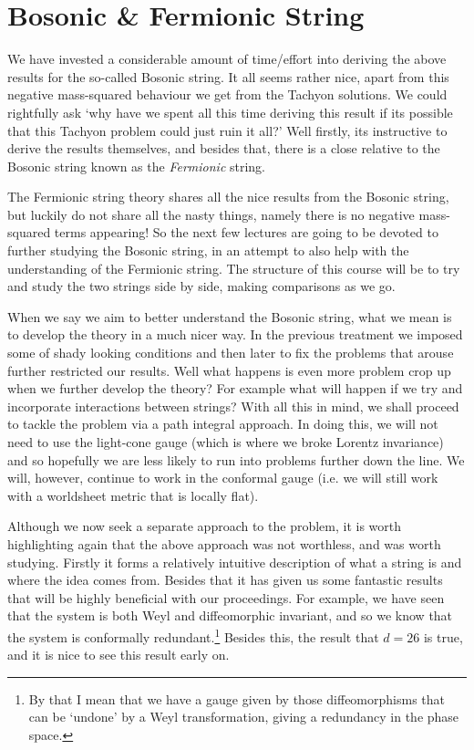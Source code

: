 \section{Bosonic \& Fermionic String}

We have invested a considerable amount of time/effort into deriving the above results for the so-called Bosonic string. It all seems rather nice, apart from this negative mass-squared behaviour we get from the Tachyon solutions. We could rightfully ask `why have we spent all this time deriving this result if its possible that this Tachyon problem could just ruin it all?' Well firstly, its instructive to derive the results themselves, and besides that, there is a close relative to the Bosonic string known as the \textit{Fermionic} string. 

The Fermionic string theory shares all the nice results from the Bosonic string, but luckily do not share all the nasty things, namely there is no negative mass-squared terms appearing! So the next few lectures are going to be devoted to further studying the Bosonic string, in an attempt to also help with the understanding of the Fermionic string. The structure of this course will be to try and study the two strings side by side, making comparisons as we go. 

When we say we aim to better understand the Bosonic string, what we mean is to develop the theory in a much nicer way. In the previous treatment we imposed some of shady looking conditions and then later to fix the problems that arouse further restricted our results. Well what happens is even more problem crop up when we further develop the theory? For example what will happen if we try and incorporate interactions between strings? With all this in mind, we shall proceed to tackle the problem via a path integral approach. In doing this, we will not need to use the light-cone gauge (which is where we broke Lorentz invariance) and so hopefully we are less likely to run into problems further down the line. We will, however, continue to work in the conformal gauge (i.e. we will still work with a worldsheet metric that is locally flat). 

Although we now seek a separate approach to the problem, it is worth highlighting again that the above approach was not worthless, and was worth studying. Firstly it forms a relatively intuitive description of what a string is and where the idea comes from. Besides that it has given us some fantastic results that will be highly beneficial with our proceedings. For example, we have seen that the system is both Weyl and diffeomorphic invariant, and so we know that the system is conformally redundant.\footnote{By that I mean that we have a gauge given by those diffeomorphisms that can be `undone' by a Weyl transformation, giving a redundancy in the phase space.} Besides this, the result that $d=26$ is true, and it is nice to see this result early on.  